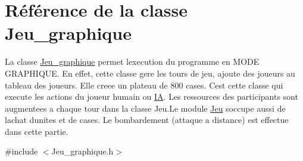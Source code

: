 \hypertarget{classJeu__graphique}{}\section{Référence de la classe Jeu\+\_\+graphique}
\label{classJeu__graphique}


La classe \hyperlink{classJeu__graphique}{Jeu\+\_\+graphique} permet l\textquotesingle{}execution du programme en M\+O\+DE G\+R\+A\+P\+H\+I\+Q\+UE. En effet, cette classe gere les tours de jeu, ajoute des joueurs au tableau des joueurs. Elle creee un plateau de 800 cases. C\textquotesingle{}est cette classe qui execute les actions du joueur humain ou \hyperlink{classIA}{IA}. Les ressources des participants sont augmentees a chaque tour dans la classe Jeu.\+Le module \hyperlink{classJeu}{Jeu} s\textquotesingle{}occupe aussi de l\textquotesingle{}achat d\textquotesingle{}unites et de cases. Le bombardement (attaque a distance) est effectue dans cette partie.  




{\ttfamily \#include $<$Jeu\+\_\+graphique.\+h$>$}

